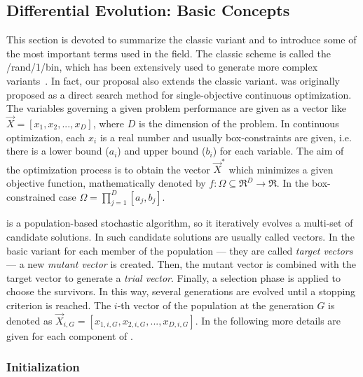\subsection{Differential Evolution: Basic Concepts}

This section is devoted to summarize the classic \DE{} variant and to introduce some of the most important terms used in the \DE{} field.
%
The classic \DE{} scheme is called the \DE{}/rand/1/bin, which has been extensively used to generate more complex \DE{} variants~\cite{das2011differential}.
%
In fact, our proposal also extends the classic variant.
%
%
\DE{} was originally proposed as a direct search method for single-objective continuous optimization.
%
The variables governing a given problem performance are given as a vector like $\vec{X} = [x_1, x_2, ..., x_D]$, where $D$ is the
dimension of the problem.
%
In continuous optimization, each $x_i$ is a real number and usually box-constraints are given, i.e. there is a lower bound ($a_{i}$) and
upper bound ($b_{i}$) for each variable.
%
The aim of the optimization process is to obtain the vector $\vec{X}^*$ which minimizes a given objective function, mathematically 
denoted by $f : \Omega \subseteq \Re^D \rightarrow \Re$.
%
In the box-constrained case $\Omega = {\prod}_{j=1}^{D} [a_{j}, b_{j}]$.

\DE{} is a population-based stochastic algorithm, so it iteratively evolves a multi-set of candidate solutions.
%
In \DE{} such candidate solutions are usually called vectors.
%
In the basic \DE{} variant for each member of the population --- they are called \textit{target vectors} --- a new \textit{mutant vector}
is created.
%
Then, the mutant vector is combined with the target vector to generate a \textit{trial vector}.
%
Finally, a selection phase is applied to choose the survivors.
%
In this way, several generations are evolved until a stopping criterion is reached.
%
The $i$-th vector of the population at the generation $G$ is denoted as $\vec{X}_{i,G} = [x_{1,i,G}, x_{2,i,G},..., x_{D,i, G}]$.
%
In the following more details are given for each component of \DE{}.


\subsubsection{Initialization}

